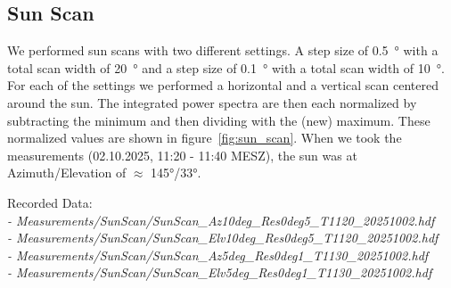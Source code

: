 \subsection{Sun Scan}\label{sec:sun_scan}
We performed sun scans with two different settings.
A step size of \SI{0.5}{\degree} with a total scan width of \SI{20}{\degree} and a step size of \SI{0.1}{\degree} with a total scan width of \SI{10}{\degree}.
For each of the settings we performed a horizontal and a vertical scan centered around the sun.
The integrated power spectra are then each normalized by subtracting the minimum and then dividing with the (new) maximum.
These normalized values are shown in figure~\ref{fig:sun_scan}.
When we took the measurements (02.10.2025, 11:20 - 11:40 MESZ), the sun was at Azimuth/Elevation of $\approx$ 145°/33°.

Recorded Data: \\
\textit{
- Measurements/SunScan/SunScan\_Az10deg\_Res0deg5\_T1120\_20251002.hdf \\
- Measurements/SunScan/SunScan\_Elv10deg\_Res0deg5\_T1120\_20251002.hdf \\
- Measurements/SunScan/SunScan\_Az5deg\_Res0deg1\_T1130\_20251002.hdf \\
- Measurements/SunScan/SunScan\_Elv5deg\_Res0deg1\_T1130\_20251002.hdf \\
} \\
